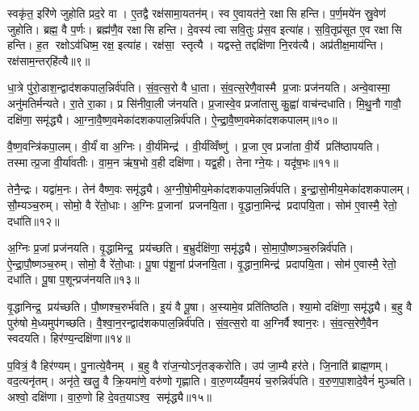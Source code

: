 स्वकृ॑त॒ इरि॑णे जुहोति प्रद॒रे वा। ए॒तद्वै रक्ष॑सामा॒यतन॑म्। स्व ए॒वायत॑ने॒ रक्षासि हन्ति। प॒र्ण॒मये॑न स्रु॒वेण॑ जुहोति। ब्रह्म॒ वै प॒र्णः। ब्रह्म॑णै॒व रक्षासि हन्ति। दे॒वस्य॑ त्वा सवि॒तुः प्र॑स॒व इत्या॑ह। स॒वि॒तृप्र॑सूत ए॒व रक्षासि हन्ति। ह॒त रक्षोऽव॑धिष्म॒ रक्ष॒ इत्या॑ह। रक्ष॑सा॒ स्तृत्यै। यद्वस्ते॒ तद्दक्षि॑णा नि॒रव॑त्यै। अप्र॑तीक्ष॒माय॑न्ति। रक्ष॑साम॒न्तर्‌हि॑त्यै॥९॥\anuvakamend[य॒च्छ॒ति॒ वरु॑ण॒न्तृती॑य॒व्विँजि॑त्या असृजत॒ समृ॑द्ध्यै हनो॒ मित्र॑द्रु॒गिति॑ हन्ति॒ स्तृत्यै॒ त्रीणि॑ च]

धा॒त्रे पु॑रो॒डाश॒न्द्वाद॑शकपाल॒न्निर्व॑पति। सं॒व॒त्स॒रो वै धा॒ता। सं॒व॒त्स॒रेणै॒वास्मै प्र॒जाः प्रज॑नयति। अन्वे॒वास्मा॒ अनु॑मतिर्मन्यते। रा॒ते रा॒का। प्र सि॑नीवा॒ली ज॑नयति। प्र॒जास्वे॒व प्रजा॑तासु कु॒ह्वा॑ वाच॑न्दधाति। मि॒थु॒नौ गावौ॒ दक्षि॑णा॒ समृ॑द्ध्यै। आ॒ग्ना॒वै॒ष्ण॒वमेका॑दशकपाल॒न्निर्व॑पति। ऐ॒न्द्रा॒वै॒ष्ण॒वमेका॑दशकपालम्॥१०॥

वै॒ष्ण॒वन्त्रि॑कपा॒लम्। वी॒र्यं॑ वा अ॒ग्निः। वी॒र्य॑मिन्द्र॑। वी॒र्य॑व्विँष्णु॑। प्र॒जा ए॒व प्रजा॑ता वी॒र्ये प्रति॑ष्ठापयति। तस्मात्प्र॒जा वी॒र्या॑वतीः। वा॒म॒न ऋ॑ष॒भो व॒ही दक्षि॑णा। यद्व॒ही। तेनाग्ने॒यः। यदृ॑ष॒भः॥११॥

तेनै॒न्द्रः। यद्वा॑म॒नः। तेन॑ वैष्ण॒वः समृ॑द्ध्यै। अ॒ग्नी॒षो॒मीय॒मेका॑दशकपाल॒न्निर्व॑पति। इ॒न्द्रा॒सो॒मीय॒मेका॑दशकपालम्। सौ॒म्यञ्च॒रुम्। सोमो॒ वै रे॑तो॒धाः। अ॒ग्निः प्र॒जानां प्रजनयि॒ता। वृ॒द्धाना॒मिन्द्र॑ प्रदापयि॒ता। सोम॑ ए॒वास्मै॒ रेतो॒ दधा॑ति॥१२॥

अ॒ग्निः प्र॒जां प्रज॑नयति। वृ॒द्धामिन्द्र॒ प्रय॑च्छति। ब॒भ्रुर्दक्षि॑णा॒ समृ॑द्ध्यै। सो॒मा॒पौ॒ष्णञ्च॒रुन्निर्व॑पति। ऐ॒न्द्रा॒पौ॒ष्णञ्च॒रुम्। सोमो॒ वै रे॑तो॒धाः। पू॒षा प॑शू॒नां प्र॑जनयि॒ता। वृ॒द्धाना॒मिन्द्र॑ प्रदापयि॒ता। सोम॑ ए॒वास्मै॒ रेतो॒ दधा॑ति। पू॒षा प॒शून्प्रज॑नयति॥१३॥

वृ॒द्धानिन्द्र॒ प्रय॑च्छति। पौ॒ष्णश्च॒रुर्भ॑वति। इ॒यं वै पू॒षा। अ॒स्यामे॒व प्रति॑तिष्ठति। श्या॒मो दक्षि॑णा॒ समृ॑द्ध्यै। ब॒हु वै पुरु॑षो मे॒ध्यमुप॑गच्छति। वै॒श्वा॒न॒रन्द्वाद॑शकपाल॒न्निर्व॑पति। सं॒व॒त्स॒रो वा अ॒ग्निर्वैश्वान॒रः। सं॒व॒त्स॒रेणै॒वैन स्वदयति। हिर॑ण्य॒न्दक्षि॑णा॥१४॥

प॒वित्रं॒ वै हिर॑ण्यम्। पु॒नात्ये॒वैनम्। ब॒हु वै रा॑ज॒न्योऽनृ॑तङ्करोति। उप॑ जा॒म्यै हर॑ते। जि॒नाति॑ ब्राह्म॒णम्। वद॒त्यनृ॑तम्। अनृ॑ते॒ खलु॒ वै क्रि॒यमा॑णे॒ वरु॑णो गृह्णाति। वा॒रु॒णय्यँ॑व॒मयं॑ च॒रुन्निर्व॑पति। व॒रु॒ण॒पा॒शादे॒वैनं॑ मुञ्चति। अश्वो॒ दक्षि॑णा। वा॒रु॒णो हि दे॒वत॒याऽश्व॒ समृ॑द्ध्यै॥१५॥

